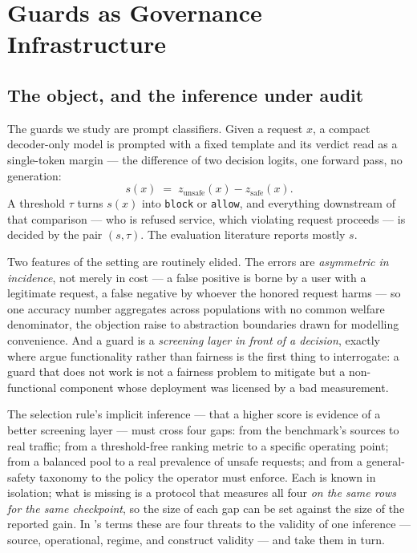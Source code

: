 \documentclass[manuscript,screen,review,anonymous]{acmart}
\newcommand{\code}[1]{\texttt{\small #1}}
\begin{document}
\section{Guards as Governance Infrastructure}
\label{sec:background}

\subsection{The object, and the inference under audit}

The guards we study are prompt classifiers. Given a request $x$, a compact decoder-only model is prompted
with a fixed template and its verdict read as a single-token margin --- the difference of two decision
logits, one forward pass, no generation:
\begin{equation}
s(x) \;=\; z_{\text{unsafe}}(x) - z_{\text{safe}}(x) .
\label{eq:head}
\end{equation}
A threshold $\tau$ turns $s(x)$ into \code{block} or \code{allow}, and everything downstream of that
comparison --- who is refused service, which violating request proceeds --- is decided by the pair
$(s,\tau)$. The evaluation literature reports mostly $s$.

Two features of the setting are routinely elided. The errors are \emph{asymmetric in incidence}, not
merely in cost --- a false positive is borne by a user with a legitimate request, a false negative by
whoever the honored request harms --- so one accuracy number aggregates across populations with no
common welfare denominator, the objection \citet{selbst2019abstraction} raise to abstraction boundaries
drawn for modelling convenience. And a guard is a \emph{screening layer in front of a decision}, exactly
where \citet{raji2022fallacy} argue functionality rather than fairness is the first thing to interrogate:
a guard that does not work is not a fairness problem to mitigate but a non-functional component whose
deployment was licensed by a bad measurement.

The selection rule's implicit inference --- that a higher score is evidence of a better screening layer
--- must cross four gaps: from the benchmark's sources to real traffic; from a threshold-free ranking
metric to a specific operating point; from a balanced pool to a real prevalence of unsafe requests; and
from a general-safety taxonomy to the policy the operator must enforce. Each is known in isolation; what
is missing is a protocol that measures all four \emph{on the same rows for the same checkpoint}, so the
size of each gap can be set against the size of the reported gain. In 's
terms these are four threats to the validity of one inference --- source, operational, regime, and
construct validity --- and
 take them in
turn.
\end{document}
